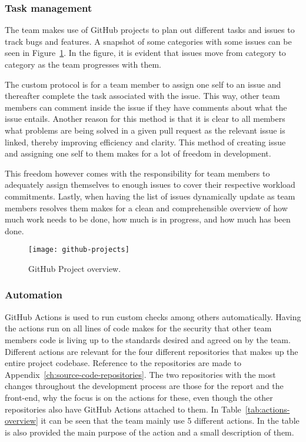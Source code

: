 \subsubsection{Task management}

The team makes use of GitHub projects to plan out different tasks and issues to track bugs and features.
A snapshot of some categories with some issues can be seen in Figure~\ref{fig:github-project}.
In the figure, it is evident that issues move from category to category as the team progresses with them.

The custom protocol is for a team member to assign one self to an issue and thereafter complete the task associated with
the issue.
This way, other team members can comment inside the issue if they have comments about what the issue entails.
Another reason for this method is that it is clear to all members what problems are being solved in a given pull request
as the relevant issue is linked, thereby improving efficiency and clarity.
This method of creating issue and assigning one self to them makes for a lot of freedom in development.

This freedom however comes with the responsibility for team members to adequately assign themselves to enough issues to
cover their respective workload commitments.
Lastly, when having the list of issues dynamically update as team members resolves them makes for a clean and
comprehensible overview of how much work needs to be done, how much is in progress, and how much has been done.

\begin{figure}[htb]
    \centering
    \texttt{[image: github-projects]}
    \caption{GitHub Project overview.}\label{fig:github-project}
\end{figure}

\subsubsection{Automation}

GitHub Actions is used to run custom checks among others automatically.
Having the actions run on all lines of code makes for the security that other team members code is living up to the
standards desired and agreed on by the team.
Different actions are relevant for the four different repositories that makes up the entire project codebase.
Reference to the repositories are made to Appendix~\ref{ch:source-code-repositories}.
The two repositories with the most changes throughout the development process are those for the report and the
front-end, why the focus is on the actions for these, even though the other repositories also have GitHub Actions
attached to them.
In Table~\ref{tab:actions-overview} it can be seen that the team mainly use 5 different actions.
In the table is also provided the main purpose of the action and a small description of them.

